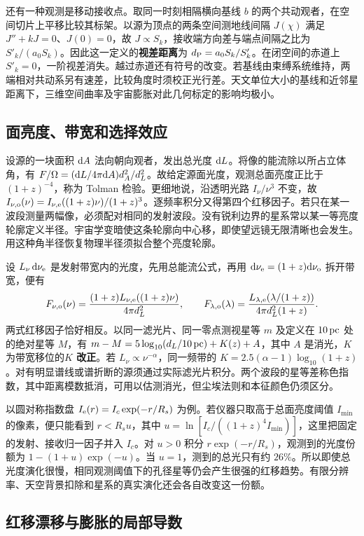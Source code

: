 还有一种观测是移动接收点。取同一时刻相隔横向基线 $b$ 的两个共动观者，在空间切片上平移比较其标架。以源为顶点的两条空间测地线间隔 $J(\chi)$ 满足 $J''+kJ=0$、$J(0)=0$，故 $J\propto S_k$，接收端方向差与端点间隔之比为 $S'_k/(a_0S_k)$。因此这一定义的\textbf{视差距离}为 $d_{\rm P}=a_0S_k/S'_k$。在闭空间的赤道上 $S'_k=0$，一阶视差消失。越过赤道还有符号的改变。若基线由束缚系统维持，两端相对共动系另有速差，比较角度时须校正光行差。天文单位大小的基线和近邻星距离下，三维空间曲率及宇宙膨胀对此几何标定的影响均极小。

\subsection{面亮度、带宽和选择效应}

设源的一块面积 $\dd A$ 法向朝向观者，发出总光度 $\dd L$。将像的能流除以所占立体角，有 $F/\Omega=(\dd L/4\pi\dd A)d_A^2/d_L^2$。故给定源面光度，观测总面亮度正比于 $(1+z)^{-4}$，称为 Tolman 检验。更细地说，沿透明光路 $I_\nu/\nu^3$ 不变，故 $I_{\nu,{\rm o}}(\nu)=I_{\nu,{\rm e}}((1+z)\nu)/(1+z)^3$。逐频率积分又得第四个红移因子。若只在某一波段测量两幅像，必须配对相同的发射波段。没有锐利边界的星系常以某一等亮度轮廓定义半径。宇宙学变暗使这条轮廓向中心移，即使望远镜无限清晰也会发生。用这种角半径恢复物理半径须拟合整个亮度轮廓。

设 $L_\nu\,\dd\nu_{\rm e}$ 是发射带宽内的光度，先用总能流公式，再用 $\dd\nu_{\rm e}=(1+z)\dd\nu_{\rm o}$ 拆开带宽，便有
\[
 F_{\nu,{\rm o}}(\nu)=
       \frac{(1+z)L_{\nu,{\rm e}}((1+z)\nu)}{4\pi d_L^2},
 \qquad
 F_{\lambda,{\rm o}}(\lambda)=
       \frac{L_{\lambda,{\rm e}}(\lambda/(1+z))}{4\pi d_L^2(1+z)} .
\]
两式红移因子恰好相反。以同一滤光片、同一零点测视星等 $m$ 及定义在 $10\,{\rm pc}$ 处的绝对星等 $M$，有 $m-M=5\log_{10}(d_L/10\,{\rm pc})+K(z)+A$，其中 $A$ 是消光，$K$ 为带宽移位的\textbf{$K$ 改正}。若 $L_\nu\propto\nu^{-\alpha}$，同一频带的 $K=2.5(\alpha-1)\log_{10}(1+z)$。对有明显谱线或谱折断的源须通过实际滤光片积分。两个波段的星等差称色指数，其中距离模数抵消，可用以估测消光，但尘埃法则和本征颜色仍须区分。

以圆对称指数盘 $I_{\rm e}(r)=I_c\exp(-r/R_s)$ 为例。若仪器只取高于总面亮度阈值 $I_{\min}$ 的像素，便只能看到 $r<R_s u$，其中 $u=\ln[I_c/((1+z)^4I_{\min})]$，这里把固定的发射、接收归一因子并入 $I_c$。对 $u>0$ 积分 $r\exp(-r/R_s)$，观测到的光度份额为 $1-(1+u)\exp(-u)$。当 $u=1$，测到的总光只有约 $26\%$。所以即使总光度演化很慢，相同观测阈值下的孔径星等仍会产生很强的红移趋势。有限分辨率、天空背景扣除和星系的真实演化还会各自改变这一份额。

\subsection{红移漂移与膨胀的局部导数}

